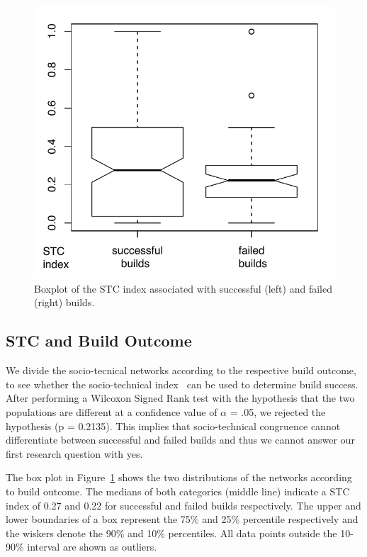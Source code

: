 \documentclass{sig-alternate}
\begin{document}
\begin{figure}[t]
\centering
\includegraphics[width=.7\columnwidth]{stcboxplot.pdf}
\vspace{-.3cm}
\caption{Boxplot of the STC index associated with successful (left) and failed
(right) builds.}
\label{fig:stcboxplot}
\end{figure}

\subsection{STC and Build Outcome}
We divide the socio-tecnical networks according to the respective build outcome,
to see whether the socio-technical index~\cite{cataldo:cscw:2006} can be used to determine build success.
After performing a Wilcoxon Signed Rank test with the hypothesis
that the two populations are different at a confidence value of $\alpha$ = .05,
we rejected the hypothesis (p = 0.2135). 
This implies that socio-technical
congruence cannot differentiate between successful and failed builds and thus we
cannot answer our first research question with yes.

The box plot in Figure~\ref{fig:stcboxplot} shows the two distributions of the
networks according to build outcome. 
The medians of both categories (middle line) indicate a STC index of 0.27 and 0.22 for successful and failed builds respectively. 
The upper and lower boundaries of a box
represent the 75\% and 25\% percentile respectively and the wiskers denote the
90\% and 10\% percentiles. All data points outside the 10-90\% interval are shown
as outliers.
\end{document}
